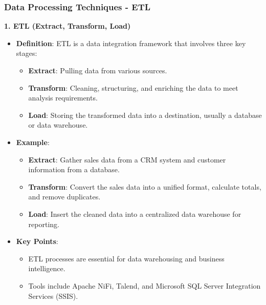 \documentclass[aspectratio=169]{beamer}
\begin{document}
\begin{frame}[fragile]
    \frametitle{Data Processing Techniques - ETL}
    
    \textbf{1. ETL (Extract, Transform, Load)}
    
    \begin{itemize}
        \item \textbf{Definition}: ETL is a data integration framework that involves three key stages:
        \begin{itemize}
            \item \textbf{Extract}: Pulling data from various sources.
            \item \textbf{Transform}: Cleaning, structuring, and enriching the data to meet analysis requirements.
            \item \textbf{Load}: Storing the transformed data into a destination, usually a database or data warehouse.
        \end{itemize}

        \item \textbf{Example}: 
        \begin{itemize}
            \item \textbf{Extract}: Gather sales data from a CRM system and customer information from a database.
            \item \textbf{Transform}: Convert the sales data into a unified format, calculate totals, and remove duplicates.
            \item \textbf{Load}: Insert the cleaned data into a centralized data warehouse for reporting.
        \end{itemize}

        \item \textbf{Key Points}:
        \begin{itemize}
            \item ETL processes are essential for data warehousing and business intelligence.
            \item Tools include Apache NiFi, Talend, and Microsoft SQL Server Integration Services (SSIS).
        \end{itemize}
    \end{itemize}
\end{frame}
\end{document}
